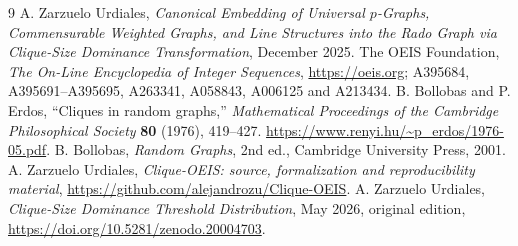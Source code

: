 \documentclass[11pt,a4paper]{article}
\theoremstyle{definition}
\begin{document}
\begin{thebibliography}{9}
 A. Zarzuelo Urdiales,
\emph{Canonical Embedding of Universal $p$-Graphs, Commensurable
Weighted Graphs, and Line Structures into the Rado Graph via
Clique-Size Dominance Transformation}, December 2025.
 The OEIS Foundation,
\emph{The On-Line Encyclopedia of Integer Sequences},
\url{https://oeis.org}; A395684, A395691--A395695,
A263341, A058843, A006125 and A213434.
 B. Bollobas and P. Erdos,
``Cliques in random graphs,'' \emph{Mathematical Proceedings of
the Cambridge Philosophical Society} \textbf{80} (1976), 419--427.
\url{https://www.renyi.hu/~p_erdos/1976-05.pdf}.
 B. Bollobas, \emph{Random Graphs},
2nd ed., Cambridge University Press, 2001.
 A. Zarzuelo Urdiales,
\emph{Clique-OEIS: source, formalization and reproducibility material},
\url{https://github.com/alejandrozu/Clique-OEIS}.
 A. Zarzuelo Urdiales,
\emph{Clique-Size Dominance Threshold Distribution}, May 2026,
original edition, \url{https://doi.org/10.5281/zenodo.20004703}.
\end{thebibliography}
\end{document}
